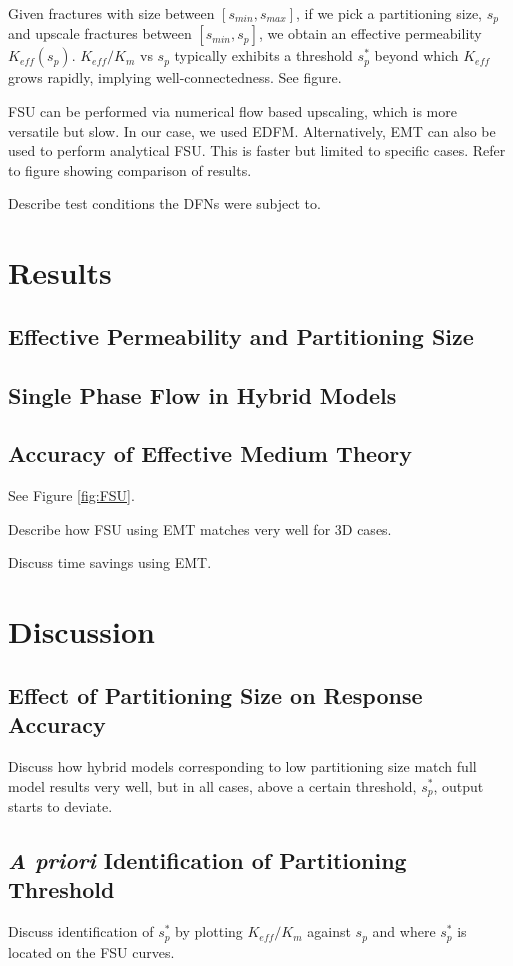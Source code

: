 \documentclass[a4paper]{article}
\begin{document}
Given fractures with size between $[s_{min},s_{max}]$, if we pick a partitioning size, $s_p$ and upscale fractures between $[s_{min},s_p]$, we obtain an effective permeability $K_{eff}(s_p)$. $K_{eff}/K_m$ vs $s_p$ typically exhibits a threshold $s_p^*$ beyond which $K_{eff}$ grows rapidly, implying well-connectedness. See figure.

FSU can be performed via numerical flow based upscaling, which is more versatile but slow. In our case, we used EDFM. Alternatively, EMT can also be used to perform analytical FSU. This is faster but limited to specific cases. Refer to figure showing comparison of results.

Describe test conditions the DFNs were subject to.

\section{Results}
\subsection{Effective Permeability and Partitioning Size}


\subsection{Single Phase Flow in Hybrid Models}



\subsection{Accuracy of Effective Medium Theory}
See Figure \ref{fig:FSU}.

Describe how FSU using EMT matches very well for 3D cases.

Discuss time savings using EMT.

\section{Discussion}
\subsection{Effect of Partitioning Size on Response Accuracy}
Discuss how hybrid models corresponding to low partitioning size match full model results very well, but in all cases, above a certain threshold, $s_p^*$, output starts to deviate.

\subsection{\textit{A priori} Identification of Partitioning Threshold}
Discuss identification of $s_p^*$ by plotting $K_{eff}/K_m$ against $s_p$ and where $s_p^*$ is located on the FSU curves.
\end{document}
